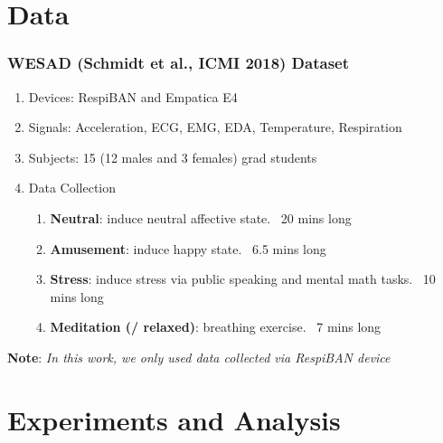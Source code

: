 \documentclass[unknownkeysallowed]{beamer}
\begin{document}
\section{Data}

\begin{frame}
\frametitle{WESAD (Schmidt et al., ICMI 2018) Dataset}

\begin{enumerate}[-]
    \item Devices: RespiBAN and Empatica E4
    \item Signals: Acceleration, ECG, EMG, EDA, Temperature, Respiration 
    \item Subjects: 15 (12 males and 3 females) grad students
    \item Data Collection
    \begin{enumerate}[1.]
        \item \textbf{Neutral}: induce neutral affective state. ~20 mins long
        \item \textbf{Amusement}: induce happy state. ~6.5 mins long
        \item \textbf{Stress}: induce stress via public speaking and mental math tasks.  ~10 mins long
        \item \textbf{Meditation (/ relaxed)}: breathing exercise. ~7 mins long
    \end{enumerate}
    
\end{enumerate}

\textbf{Note}: \textit{In this work, we only used data collected via RespiBAN device}

\end{frame}


\section{Experiments and Analysis}
\end{document}
